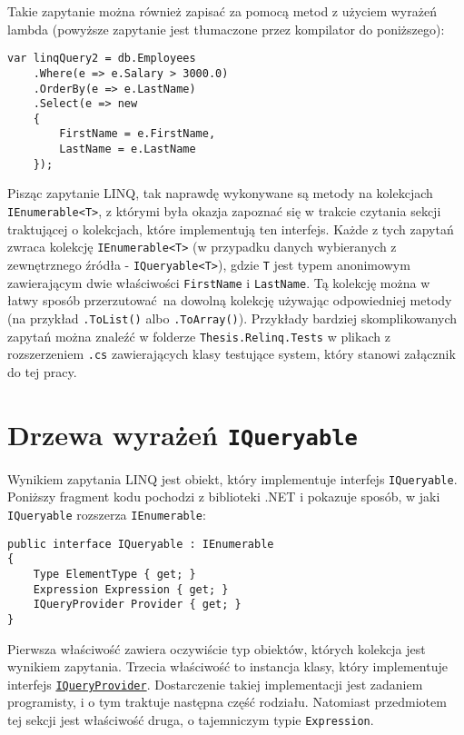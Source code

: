 Takie zapytanie można również zapisać za pomocą metod z użyciem wyrażeń lambda (powyższe zapytanie jest tłumaczone przez kompilator do poniższego): \pagebreak

\begin{lstlisting}
var linqQuery2 = db.Employees
    .Where(e => e.Salary > 3000.0)
    .OrderBy(e => e.LastName)
    .Select(e => new
    { 
        FirstName = e.FirstName,
        LastName = e.LastName
    });
\end{lstlisting}

Pisząc zapytanie LINQ, tak naprawdę wykonywane są metody na kolekcjach \texttt{IEnumerable<T>}, z którymi była okazja zapoznać się w trakcie czytania sekcji traktującej o kolekcjach, które implementują ten interfejs. Każde z tych zapytań zwraca kolekcję \texttt{IEnumerable<T>} (w przypadku danych wybieranych z zewnętrznego źródła - \texttt{IQueryable<T>}), gdzie \texttt{T} jest typem anonimowym zawierającym dwie właściwości \texttt{FirstName} i \texttt{LastName}. Tą kolekcję można w łatwy sposób przerzutować na dowolną kolekcję używając odpowiedniej metody (na przykład \texttt{.ToList()} albo \linebreak \texttt{.ToArray()}). Przykłady bardziej skomplikowanych zapytań można znaleźć w folderze \texttt{Thesis.Relinq.Tests} w plikach z rozszerzeniem \texttt{.cs} zawierających klasy testujące system, który stanowi załącznik do tej pracy.

\section{Drzewa wyrażeń \texttt{IQueryable}}
Wynikiem zapytania LINQ jest obiekt, który implementuje interfejs \texttt{IQueryable}. Poniższy fragment kodu pochodzi z biblioteki .NET i pokazuje sposób, w jaki \texttt{IQueryable} rozszerza \texttt{IEnumerable}:

\begin{lstlisting}
public interface IQueryable : IEnumerable
{
    Type ElementType { get; }
    Expression Expression { get; }
    IQueryProvider Provider { get; }
}
\end{lstlisting}

Pierwsza właściwość zawiera oczywiście typ obiektów, których kolekcja jest wynikiem zapytania. Trzecia właściwość to instancja klasy, który implementuje interfejs \href{https://msdn.microsoft.com/pl-pl/library/system.linq.iqueryprovider(v=vs.110).aspx}{\texttt{IQueryProvider}}. Dostarczenie takiej implementacji jest zadaniem programisty, i o tym traktuje następna część rodziału. Natomiast przedmiotem tej sekcji jest właściwość druga, o tajemniczym typie \texttt{Expression}.


